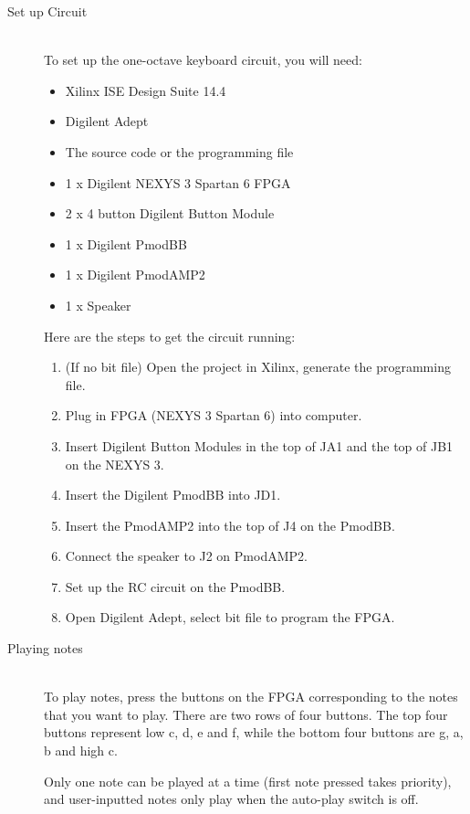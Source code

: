 \documentclass{article}
\begin{document}
    \begin{description}
      \item[Set up Circuit] \hfill \\
        To set up the one-octave keyboard circuit, you will need:
        \begin{itemize}
          \item Xilinx ISE Design Suite 14.4
          \item Digilent Adept
          \item The source code or the programming file
          \item 1 x Digilent NEXYS 3 Spartan 6 FPGA
          \item 2 x 4 button Digilent Button Module
          \item 1 x Digilent PmodBB
          \item 1 x Digilent PmodAMP2
          \item 1 x Speaker
        \end{itemize}

        Here are the steps to get the circuit running:
        \begin{enumerate}
          \item (If no bit file) Open the project in Xilinx, generate the programming file.
          \item Plug in FPGA (NEXYS 3 Spartan 6) into computer.
          \item Insert Digilent Button Modules in the top of JA1 and the top of JB1 on the NEXYS 3.
          \item Insert the Digilent PmodBB into JD1.
          \item Insert the PmodAMP2 into the top of J4 on the PmodBB. 
          \item Connect the speaker to J2 on PmodAMP2.
          \item Set up the RC circuit on the PmodBB.
          \item Open Digilent Adept, select bit file to program the FPGA.
        \end{enumerate}

      \item[Playing notes] \hfill \\
        To play notes, press the buttons on the FPGA corresponding to the notes that you want to play. There are two rows of four buttons. The top four buttons represent low c, d, e and f, while the bottom four buttons are g, a, b and high c.

        Only one note can be played at a time (first note pressed takes priority), and user-inputted notes only play when the auto-play switch is off.


\end{description}
\end{document}
